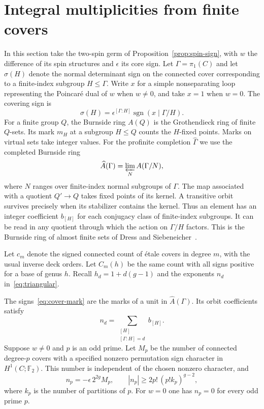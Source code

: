 \section{Integral multiplicities from finite covers}
\label{sec:marks}

In this section take the two-spin germ of Proposition~\ref{prop:spin-sign},
with $w$ the difference of its spin structures and $\epsilon$ its core sign.
Let $\Gamma=\pi_1(C)$ and let $\sigma(H)$ denote the normal determinant
sign on the connected cover corresponding to a finite-index subgroup
$H\le\Gamma$. Write $x$ for a simple nonseparating loop representing
the Poincar\'e dual of $w$ when $w\ne0$, and take $x=1$ when $w=0$.
The covering sign is
\begin{equation}
 \sigma(H)=\epsilon^{[\Gamma:H]}
      \operatorname{sgn}(x\mid\Gamma/H).
 \label{eq:cover-mark}
\end{equation}
For a finite group $Q$, the Burnside ring $A(Q)$ is the Grothendieck
ring of finite $Q$-sets. Its mark $m_H$ at a subgroup $H\le Q$ counts
the $H$-fixed points. Marks on virtual sets take integer values.
For the profinite completion $\widehat\Gamma$ we use the completed
Burnside ring
\[
  \widehat A(\Gamma)=\varprojlim_{N} A(\Gamma/N),
\]
where $N$ ranges over finite-index normal subgroups of $\Gamma$.
The map associated with a quotient $Q'\to Q$ takes fixed points of
its kernel. A transitive orbit survives precisely when its stabilizer
contains the kernel. Thus an element has an integer coefficient
$b_{[H]}$ for each conjugacy class of finite-index subgroups. It can be
read in any quotient through which the action on $\Gamma/H$ factors.
This is the Burnside ring of almost finite sets of
Dress and Siebeneicher~\cite{dress}.

Let $c_m$ denote the signed connected count of \textup{\'e}tale covers
in degree $m$, with the usual inverse deck orders. Let $C_m(h)$ be
the same count with all signs positive for a base of genus $h$.
Recall $h_d=1+d(g-1)$ and the exponents $n_d$ in~\eqref{eq:triangular}.

\begin{theorem}\label{thm:marks}
The signs~\eqref{eq:cover-mark} are the marks of a unit in
$\widehat A(\Gamma)$. Its orbit coefficients satisfy
\begin{equation}
       n_d=\sum_{\substack{[H]\\{[\Gamma:H]=d}}} b_{[H]} .
\label{eq:burnside-primitive}
\end{equation}
Suppose $w\ne0$ and $p$ is an odd prime. Let $M_p$ be the number
of connected degree-$p$ covers with a specified nonzero permutation
sign character in $H^1(C;\mathbb F_2)$. This number is independent
of the chosen nonzero character, and
\begin{equation}
 n_p=-\epsilon\,2^{2g}M_p,\qquad
 |n_p|\ge 2p!\,(p! k_p)^{g-2},
 \label{eq:prime-mark}
\end{equation}
where $k_p$ is the number of partitions of $p$. For $w=0$ one has
$n_p=0$ for every odd prime $p$.
\end{theorem}

